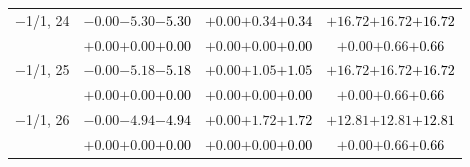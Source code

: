 \documentclass[compress]{beamer}
\begin{document}
\begin{frame}
\begin{tabular}{r | c | c | c}
$-$1/1, 24 & $-0.00$\hspace{0.1 cm}$-5.30$\hspace{0.1 cm}\textcolor{black}{$-5.30$} & $+0.00$\hspace{0.1 cm}$+0.34$\hspace{0.1 cm}\textcolor{black}{$+0.34$} & $+16.72$\hspace{0.1 cm}$+16.72$\hspace{0.1 cm}\textcolor{black}{$+16.72$} \\
           & $+0.00$\hspace{0.1 cm}$+0.00$\hspace{0.1 cm}\textcolor{black}{$+0.00$} & $+0.00$\hspace{0.1 cm}$+0.00$\hspace{0.1 cm}\textcolor{black}{$+0.00$} & $+0.00$\hspace{0.1 cm}$+0.66$\hspace{0.1 cm}\textcolor{black}{$+0.66$} \\
$-$1/1, 25 & $-0.00$\hspace{0.1 cm}$-5.18$\hspace{0.1 cm}\textcolor{black}{$-5.18$} & $+0.00$\hspace{0.1 cm}$+1.05$\hspace{0.1 cm}\textcolor{black}{$+1.05$} & $+16.72$\hspace{0.1 cm}$+16.72$\hspace{0.1 cm}\textcolor{black}{$+16.72$} \\
           & $+0.00$\hspace{0.1 cm}$+0.00$\hspace{0.1 cm}\textcolor{black}{$+0.00$} & $+0.00$\hspace{0.1 cm}$+0.00$\hspace{0.1 cm}\textcolor{black}{$+0.00$} & $+0.00$\hspace{0.1 cm}$+0.66$\hspace{0.1 cm}\textcolor{black}{$+0.66$} \\
$-$1/1, 26 & $-0.00$\hspace{0.1 cm}$-4.94$\hspace{0.1 cm}\textcolor{black}{$-4.94$} & $+0.00$\hspace{0.1 cm}$+1.72$\hspace{0.1 cm}\textcolor{black}{$+1.72$} & $+12.81$\hspace{0.1 cm}$+12.81$\hspace{0.1 cm}\textcolor{black}{$+12.81$} \\
           & $+0.00$\hspace{0.1 cm}$+0.00$\hspace{0.1 cm}\textcolor{black}{$+0.00$} & $+0.00$\hspace{0.1 cm}$+0.00$\hspace{0.1 cm}\textcolor{black}{$+0.00$} & $+0.00$\hspace{0.1 cm}$+0.66$\hspace{0.1 cm}\textcolor{black}{$+0.66$} \\

\end{tabular}
\end{frame}
\end{document}
